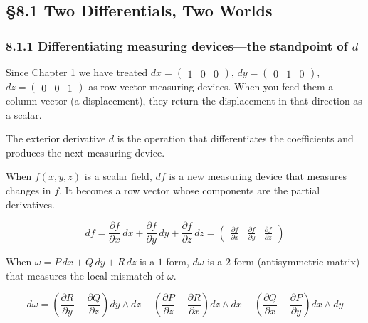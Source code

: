 \hypertarget{two-differentials-two-worlds}{%
\subsection{§8.1 Two Differentials, Two
Worlds}\label{two-differentials-two-worlds}}

\hypertarget{differentiating-measuring-devicesthe-standpoint-of-d}{%
\subsubsection{\texorpdfstring{8.1.1 Differentiating measuring
devices---the standpoint of
\(d\)}{8.1.1 Differentiating measuring devices---the standpoint of d}}\label{differentiating-measuring-devicesthe-standpoint-of-d}}

Since Chapter 1 we have treated
\(dx = \begin{pmatrix}1&0&0\end{pmatrix}\),
\(dy = \begin{pmatrix}0&1&0\end{pmatrix}\),
\(dz = \begin{pmatrix}0&0&1\end{pmatrix}\) as row-vector measuring
devices. When you feed them a column vector (a displacement), they
return the displacement in that direction as a scalar.

The exterior derivative \(d\) is the operation that differentiates the
coefficients and produces the next measuring device.

When \(f(x,y,z)\) is a scalar field, \(df\) is a new measuring device
that measures changes in \(f\). It becomes a row vector whose components
are the partial derivatives.

\[df = \frac{\partial f}{\partial x}\,dx + \frac{\partial f}{\partial y}\,dy + \frac{\partial f}{\partial z}\,dz = \begin{pmatrix} \frac{\partial f}{\partial x} & \frac{\partial f}{\partial y} & \frac{\partial f}{\partial z} \end{pmatrix}\]

When \(\omega = P\,dx + Q\,dy + R\,dz\) is a \(1\)-form, \(d\omega\) is
a \(2\)-form (antisymmetric matrix) that measures the local mismatch of
\(\omega\).

\[d\omega = \left(\frac{\partial R}{\partial y}-\frac{\partial Q}{\partial z}\right)dy\wedge dz + \left(\frac{\partial P}{\partial z}-\frac{\partial R}{\partial x}\right)dz\wedge dx + \left(\frac{\partial Q}{\partial x}-\frac{\partial P}{\partial y}\right)dx\wedge dy\]

